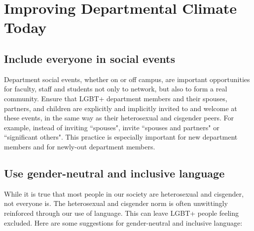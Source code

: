 %

\chapter{Improving Departmental Climate Today}	%
\label{climate-today}		%
\normalsize			%



\section {Include everyone in social events}
\label{social-events}
Department social events, whether on or off campus, are important opportunities for faculty, staff and students not only to network, but also to form a real community. Ensure that LGBT+ department members and their spouses, partners, and children are explicitly and implicitly invited to and welcome at these events, in the same way as their heterosexual and cisgender peers. For example, instead of inviting ``spouses", invite ``spouses and partners" or ``significant others". This practice is especially important for new department members and for newly-out department members. 

\section {Use gender-neutral and inclusive language}
\label{gender-language}
While it is true that most people in our society are heterosexual and cisgender, not everyone is. The heterosexual and cisgender norm is often unwittingly reinforced through our use of language. This can leave LGBT+ people feeling excluded. Here are some suggestions for gender-neutral and inclusive language:

